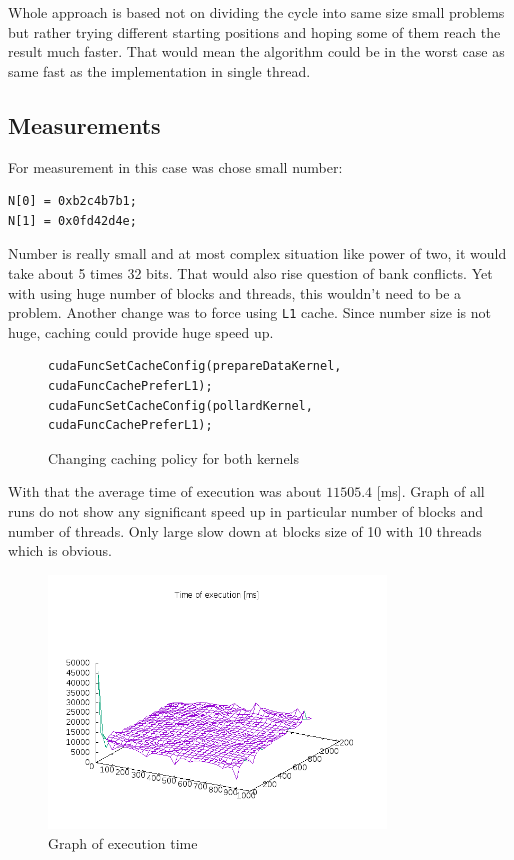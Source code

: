 \documentclass[a4paper]{article}
\begin{document}
Whole approach is based not on dividing the cycle into same size small problems but rather trying different starting positions and hoping some of them reach the result much faster. That would mean the algorithm could be in the worst case as same fast as the implementation in single thread.

\subsection{Measurements}

For measurement in this case was chose small number:

\begin{verbatim}
N[0] = 0xb2c4b7b1;
N[1] = 0x0fd42d4e;
\end{verbatim}

Number is really small and at most complex situation like power of two, it would take about 5 times 32 bits. That would also rise question of bank conflicts. Yet with using huge number of blocks and threads, this wouldn't need to be a problem. Another change was to force using \texttt{L1} cache. Since number size is not huge, caching could provide huge speed up.

 
\begin{figure}[H]
	\centering
	\begin{lstlisting}
cudaFuncSetCacheConfig(prepareDataKernel, cudaFuncCachePreferL1);
cudaFuncSetCacheConfig(pollardKernel, cudaFuncCachePreferL1);
	\end{lstlisting}
	\caption{Changing caching policy for both kernels}
	\label{llcache}
\end{figure}

With that the average time of execution was about $11505.4$ [ms]. Graph of all runs do not show any significant speed up in particular number of blocks and number of threads. Only large slow down at blocks size of 10 with 10 threads which is obvious.

\begin{figure}[H]
  \centering
    \includegraphics[width=0.8\textwidth]{graph_v1.png}
  \caption{Graph of execution time}
  \label{exec}
\end{figure}
\end{document}
